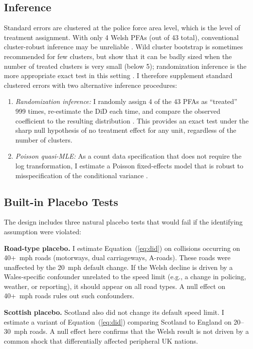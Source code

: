 \documentclass[12pt]{article}
\begin{document}
\subsection{Inference}

Standard errors are clustered at the police force area level, which is the level of treatment assignment. With only 4 Welsh PFAs (out of 43 total), conventional cluster-robust inference may be unreliable \citep{cameron2008}. Wild cluster bootstrap is sometimes recommended for few clusters, but \citet{mackinnon2022} show that it can be badly sized when the number of treated clusters is very small (below 5); randomization inference is the more appropriate exact test in this setting \citep{roth2022}. I therefore supplement standard clustered errors with two alternative inference procedures:

\begin{enumerate}
    \item \textit{Randomization inference:} I randomly assign 4 of the 43 PFAs as ``treated'' 999 times, re-estimate the DiD each time, and compare the observed coefficient to the resulting distribution \citep{fisher1999}. This provides an exact test under the sharp null hypothesis of no treatment effect for any unit, regardless of the number of clusters.
    \item \textit{Poisson quasi-MLE:} As a count data specification that does not require the log transformation, I estimate a Poisson fixed-effects model that is robust to misspecification of the conditional variance \citep{cameron2008}.
\end{enumerate}

\subsection{Built-in Placebo Tests}

The design includes three natural placebo tests that would fail if the identifying assumption were violated:

\textbf{Road-type placebo.} I estimate Equation~(\ref{eq:did}) on collisions occurring on 40+~mph roads (motorways, dual carriageways, A-roads). These roads were unaffected by the 20~mph default change. If the Welsh decline is driven by a Wales-specific confounder unrelated to the speed limit (e.g., a change in policing, weather, or reporting), it should appear on all road types. A null effect on 40+~mph roads rules out such confounders.

\textbf{Scottish placebo.} Scotland also did not change its default speed limit. I estimate a variant of Equation~(\ref{eq:did}) comparing Scotland to England on 20--30~mph roads. A null effect here confirms that the Welsh result is not driven by a common shock that differentially affected peripheral UK nations.
\end{document}
